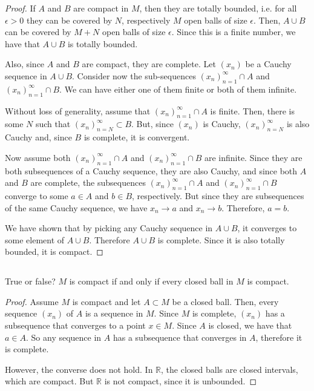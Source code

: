 \begin{proof}
If $A$ and $B$ are compact in $M$, then they are totally bounded, i.e. for all $\epsilon > 0$ they can be covered by $N$, respectively $M$ open balls of size $\epsilon$. Then, $A \cup B$ can be covered by $M+N$ open balls of size $\epsilon$. Since this is a finite number, we have that $A \cup B$ is totally bounded.

Also, since $A$ and $B$ are compact, they are complete. Let $(x_n)$ be a Cauchy sequence in $A \cup B$. Consider now the sub-sequences $(x_n)_{n=1}^\infty \cap A$ and $(x_n)_{n=1}^\infty \cap B$. We can have either one of them finite or both of them infinite.

Without loss of generality, assume that $(x_n)_{n=1}^\infty \cap A$ is finite. Then, there is some $N$ such that $(x_n)_{n=N}^\infty \subset B$. But, since $(x_n)$ is Cauchy,  $(x_n)_{n=N}^\infty$ is also Cauchy and, since $B$ is complete, it is convergent.

Now assume both $(x_n)_{n=1}^\infty \cap A$ and $(x_n)_{n=1}^\infty \cap B$ are infinite. Since they are both subsequences of a Cauchy sequence, they are also Cauchy, and since both $A$ and $B$ are complete, the subsequences $(x_n)_{n=1}^\infty \cap A$ and $(x_n)_{n=1}^\infty \cap B$ converge to some $a \in A$ and $b \in B$, respectively. But since they are subsequences of the same Cauchy sequence, we have $x_n \rightarrow a$ and $x_n \rightarrow b$. Therefore, $a = b$.

We have shown that by picking any Cauchy sequence in $A \cup B$, it converges to some element of $A \cup B$. Therefore $A \cup B$ is complete. Since it is also totally bounded, it is compact.


\end{proof}

\subsection{} True or false? $M$ is compact if and only if every closed ball in $M$ is compact.

\begin{proof}
Assume $M$ is compact and let $A \subset M$ be a closed ball. Then, every sequence $(x_n)$ of $A$ is a sequence in $M$. Since $M$ is complete, $(x_n)$ has a subsequence that converges to a point $x \in M$. Since $A$ is closed, we have that $a \in A$. So any sequence in $A$ has a subsequence that converges in $A$, therefore it is complete.

However, the converse does not hold. In $\mathbb{R}$, the closed balls are closed intervals, which are compact. But $\mathbb{R}$ is not compact, since it is unbounded.
\end{proof}
\newpage
